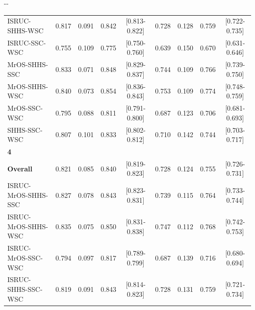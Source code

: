 \begin{table}[p]
\begin{adjustwidth*}{}{-\marginparwidth-\marginparsep}
\begin{threeparttable}
\begin{tabular}{@{}lcccccccc@{}}
\acs{ISRUC}-\acs{SHHS}-\acs{WSC}            & 0.817         & 0.091       & 0.842           & [0.813-0.822]         & 0.728         & 0.128       & 0.759           & [0.722-0.735]         \\
\acs{ISRUC}-\acs{SSC}-\acs{WSC}             & 0.755         & 0.109       & 0.775           & [0.750-0.760]         & 0.639         & 0.150       & 0.670           & [0.631-0.646]         \\
\acs{MrOS}-\acs{SHHS}-\acs{SSC}             & 0.833         & 0.071       & 0.848           & [0.829-0.837]         & 0.744         & 0.109       & 0.766           & [0.739-0.750]         \\
\acs{MrOS}-\acs{SHHS}-\acs{WSC}             & 0.840         & 0.073       & 0.854           & [0.836-0.843]         & 0.753         & 0.109       & 0.774           & [0.748-0.759]         \\
\acs{MrOS}-\acs{SSC}-\acs{WSC}              & 0.795         & 0.088       & 0.811           & [0.791-0.800]         & 0.687         & 0.123       & 0.706           & [0.681-0.693]         \\
\acs{SHHS}-\acs{SSC}-\acs{WSC}              & 0.807         & 0.101       & 0.833           & [0.802-0.812]         & 0.710         & 0.142       & 0.744           & [0.703-0.717]         \\
\textbf{4}                &               &             &                 &                       &               &             &                 &                       \\
\textbf{Overall}          & 0.821         & 0.085       & 0.840           & [0.819-0.823]         & 0.728         & 0.124       & 0.755           & [0.726-0.731]         \\
\acs{ISRUC}-\acs{MrOS}-\acs{SHHS}-\acs{SSC}       & 0.827         & 0.078       & 0.843           & [0.823-0.831]         & 0.739         & 0.115       & 0.764           & [0.733-0.744]         \\
\acs{ISRUC}-\acs{MrOS}-\acs{SHHS}-\acs{WSC}       & 0.835         & 0.075       & 0.850           & [0.831-0.838]         & 0.747         & 0.112       & 0.768           & [0.742-0.753]         \\
\acs{ISRUC}-\acs{MrOS}-\acs{SSC}-\acs{WSC}        & 0.794         & 0.097       & 0.817           & [0.789-0.799]         & 0.687         & 0.139       & 0.716           & [0.680-0.694]         \\
\acs{ISRUC}-\acs{SHHS}-\acs{SSC}-\acs{WSC}        & 0.819         & 0.091       & 0.843           & [0.814-0.823]         & 0.728         & 0.131       & 0.759           & [0.721-0.734]         \\

\end{tabular}
\end{threeparttable}
\end{adjustwidth*}
\end{table}
